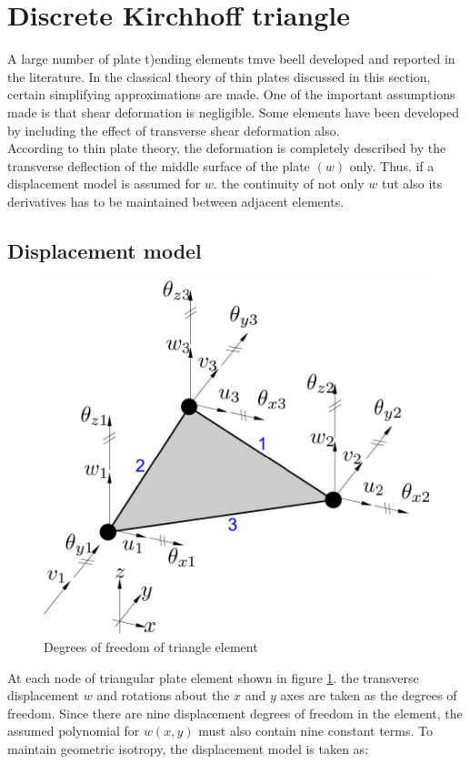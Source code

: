 \section{Discrete Kirchhoff triangle}
A large number of plate t)ending elements tmve beell developed and reported in the literature. In the classical theory of thin plates discussed in this section, certain simplifying approximations are made. One of the important assumptions made is that shear deformation is negligible. Some elements have been developed by including the effect of transverse shear deformation also. \\

According to thin plate theory, the deformation is completely described by the transverse deflection of the middle surface of the plate $ (w) $ only. Thus. if a displacement model is assumed for $ w $. the continuity of not only $ w $ tut also its derivatives has to be maintained between adjacent elements.

\subsection{Displacement model}
\begin{figure}[h!]
\centering
\includegraphics[width=0.5\linewidth]{figure/dofs_of_triangle_element}
\caption{Degrees of freedom of triangle element}
\label{fig: Nodal degrees of freedom of a triangular plate in bending}
\end{figure}

At each node of triangular plate element shown in figure \ref{fig: Nodal degrees of freedom of a triangular plate in bending}. the transverse displacement $ w $ and rotations about the $ x $ and $ y $ axes are taken as the degrees of freedom. Since there are nine displacement degrees of freedom in the element, the assumed polynomial for $ w(x,y) $ must also contain nine constant terms. To maintain geometric isotropy, the displacement model is taken as:

